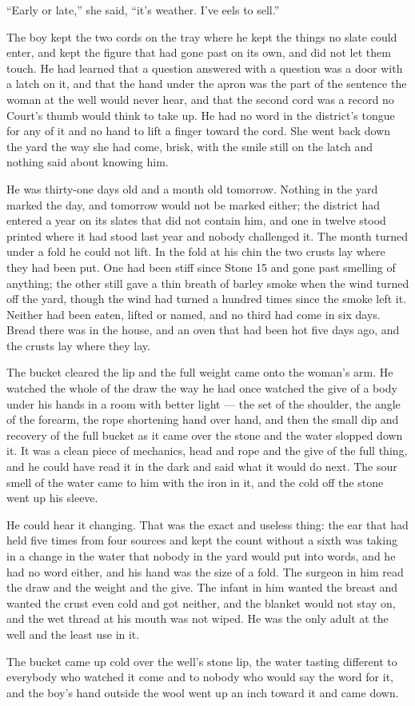 “Early or late,” she said, “it's weather. I've eels to sell.”

The boy kept the two cords on the tray where he kept the things no slate could enter, and kept the figure that had gone past on its own, and did not let them touch. He had learned that a question answered with a question was a door with a latch on it, and that the hand under the apron was the part of the sentence the woman at the well would never hear, and that the second cord was a record no Court's thumb would think to take up. He had no word in the district's tongue for any of it and no hand to lift a finger toward the cord. She went back down the yard the way she had come, brisk, with the smile still on the latch and nothing said about knowing him.

\scenebreak

He was thirty-one days old and a month old tomorrow. Nothing in the yard marked the day, and tomorrow would not be marked either; the district had entered a year on its slates that did not contain him, and one in twelve stood printed where it had stood last year and nobody challenged it. The month turned under a fold he could not lift. In the fold at his chin the two crusts lay where they had been put. One had been stiff since Stone 15 and gone past smelling of anything; the other still gave a thin breath of barley smoke when the wind turned off the yard, though the wind had turned a hundred times since the smoke left it. Neither had been eaten, lifted or named, and no third had come in six days. Bread there was in the house, and an oven that had been hot five days ago, and the crusts lay where they lay.

The bucket cleared the lip and the full weight came onto the woman's arm. He watched the whole of the draw the way he had once watched the give of a body under his hands in a room with better light --- the set of the shoulder, the angle of the forearm, the rope shortening hand over hand, and then the small dip and recovery of the full bucket as it came over the stone and the water slopped down it. It was a clean piece of mechanics, head and rope and the give of the full thing, and he could have read it in the dark and said what it would do next. The sour smell of the water came to him with the iron in it, and the cold off the stone went up his sleeve.

He could hear it changing. That was the exact and useless thing: the ear that had held  five times from four sources and kept the count without a sixth was taking in a change in the water that nobody in the yard would put into words, and he had no word either, and his hand was the size of a fold. The surgeon in him read the draw and the weight and the give. The infant in him wanted the breast and wanted the crust even cold and got neither, and the blanket would not stay on, and the wet thread at his mouth was not wiped. He was the only adult at the well and the least use in it.

The bucket came up cold over the well's stone lip, the water tasting different to everybody who watched it come and to nobody who would say the word for it, and the boy's hand outside the wool went up an inch toward it and came down.
